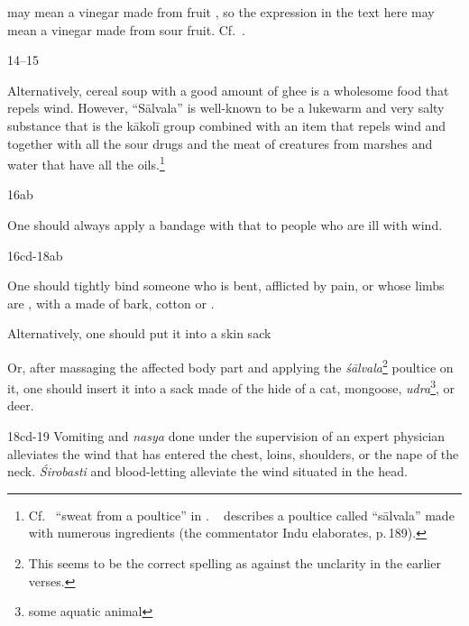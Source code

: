 \begin{translation}
{   may mean a vinegar made from fruit  
\citep[70]{moni-sans}, so the expression  in the
text here may mean a vinegar made from sour fruit. Cf.\
.}
    

    \item[14--15]
    
    Alternatively, cereal soup with a good amount of ghee is a wholesome food
    that repels wind. However, “Sālvala” is  well-known  to  be a lukewarm 
    and very salty substance that is 
    the \gls{kākolī} group combined with an item that repels wind and 
    together with all the sour drugs and 
     the meat of creatures from marshes and water that have all the 
     oils.\footnote{Cf.\ \dev{sālvaṇa} “sweat from
        a poultice” in \cite[898]{josi-maha}. \AS\ 
        describes a poultice called “sālvala” made with numerous
        ingredients (the commentator Indu elaborates, p.\,189).}   
    
        \item[16ab]
        
        One should always apply a bandage with that to people who are 
        ill with wind. 
   
   \item[16cd-18ab]
   
   One should tightly bind someone who is bent, afflicted by pain,
   or whose limbs are \se{numb}{stabdha}, with a 
    made of bark, cotton or .
   
   Alternatively,  one should put it into a skin sack 
   
   
 Or, after massaging the affected body part and applying the 
 \textit{śālvala}\footnote{This seems to be the correct spelling as against 
     the unclarity in the earlier verses.} poultice on it, one should insert it into a 
     sack made of the hide of a cat, mongoose, \textit{udra}\footnote{some 
         aquatic animal}, or deer.   
    

  
        \bigskip       
    \begin{tt}
        



   
  

    \item[18cd-19]
    Vomiting and \textit{nasya} done under the supervision of an expert 
    physician alleviates the wind that has entered the chest, loins, shoulders, or 
    the nape of the neck. \textit{Śirobasti} and blood-letting alleviate the wind 
    situated in the head. 


\end{tt}
\end{translation}
